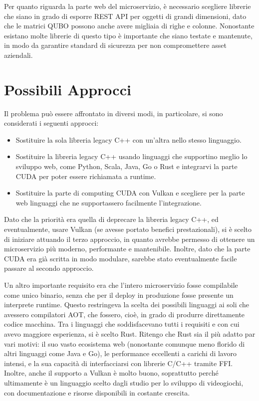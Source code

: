 Per quanto riguarda la parte web del microservizio, è necessario scegliere librerie che siano in grado di esporre REST \gls{API} per oggetti di grandi dimensioni, dato che le matrici \gls{QUBO} possono anche avere migliaia di righe e colonne. Nonostante esistano molte librerie di questo tipo è importante che siano testate e mantenute, in modo da garantire standard di sicurezza per non compromettere asset aziendali.


\section{Possibili Approcci}

Il problema può essere affrontato in diversi modi, in particolare, si sono considerati i seguenti approcci:

\begin{itemize}
    \item Sostituire la sola libreria legacy C++ con un'altra nello stesso linguaggio.
    \item Sostituire la libreria legacy C++ usando linguaggi che supportino meglio lo sviluppo web, come Python, Scala, Java, Go o Rust e integrarvi la parte \gls{CUDA} per poter essere richiamata a runtime.
    \item Sostituire la parte di computing \gls{CUDA} con Vulkan e scegliere per la parte web linguaggi che ne supportassero facilmente l'integrazione.
\end{itemize}

Dato che la priorità era quella di deprecare la libreria legacy C++, ed eventualmente, usare Vulkan (se avesse portato benefici prestazionali), si è scelto di iniziare attuando il terzo approccio, in quanto avrebbe permesso di ottenere un microservizio più moderno, performante e mantenibile. Inoltre, dato che la parte \gls{CUDA} era già scritta in modo modulare, sarebbe stato eventualmente facile passare al secondo approccio.

Un altro importante requisito era che l'intero microservizio fosse compilabile come unico binario, senza che per il deploy in produzione fosse presente un interprete runtime. Questo restringeva la scelta dei possibili linguaggi ai soli che avessero compilatori \gls{AOT}, che fossero, cioè, in grado di produrre direttamente codice macchina. Tra i linguaggi che soddisfacevano tutti i requisiti e con cui avevo maggiore esperienza, si è scelto Rust. Ritengo che Rust sia il più adatto par vari motivi: il suo vasto ecosistema web (nonostante comunque meno florido di altri linguaggi come Java e Go), le performance eccellenti a carichi di lavoro intensi, e la sua capacità di interfacciarsi con librerie C/C++ tramite \gls{FFI}. Inoltre, anche il supporto a Vulkan è molto buono, soprattutto perché ultimamente è un linguaggio scelto dagli studio per lo sviluppo di videogiochi, con documentazione e risorse disponibili in costante crescita.

